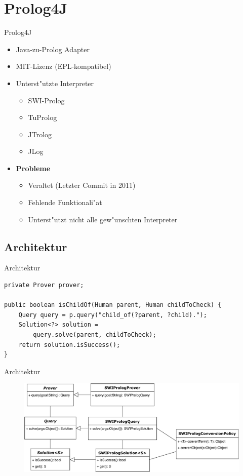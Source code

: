 \documentclass[18pt]{beamer}
\begin{document}
\section{Prolog4J}
\begin{frame}{Prolog4J}
\begin{itemize}
\item Java-zu-Prolog Adapter
\item MIT-Lizenz (EPL-kompatibel)
\item Unterst"utzte Interpreter
\begin{itemize}
\item SWI-Prolog
\item TuProlog
\item JTrolog
\item JLog
\end{itemize}
\vspace{0.3cm}
\item \textbf{Probleme}
\begin{itemize}
\item Veraltet (Letzter Commit in 2011)
\item Fehlende Funktionali"at
\item Unterst"utzt nicht alle gew"unschten Interpreter
\end{itemize}
\end{itemize}
\end{frame}
\subsection{Architektur}
\begin{frame}[fragile]{Architektur}
\begin{verbatim}
private Prover prover;

public boolean isChildOf(Human parent, Human childToCheck) {
    Query query = p.query("child_of(?parent, ?child).");
    Solution<?> solution = 
        query.solve(parent, childToCheck);
    return solution.isSuccess();
}
\end{verbatim}
\end{frame}
\begin{frame}{Architektur}
\begin{figure}[h]
\centering
\includegraphics[width=1\textwidth]{prolog4j.pdf}
\end{figure}
\end{frame}
\end{document}
